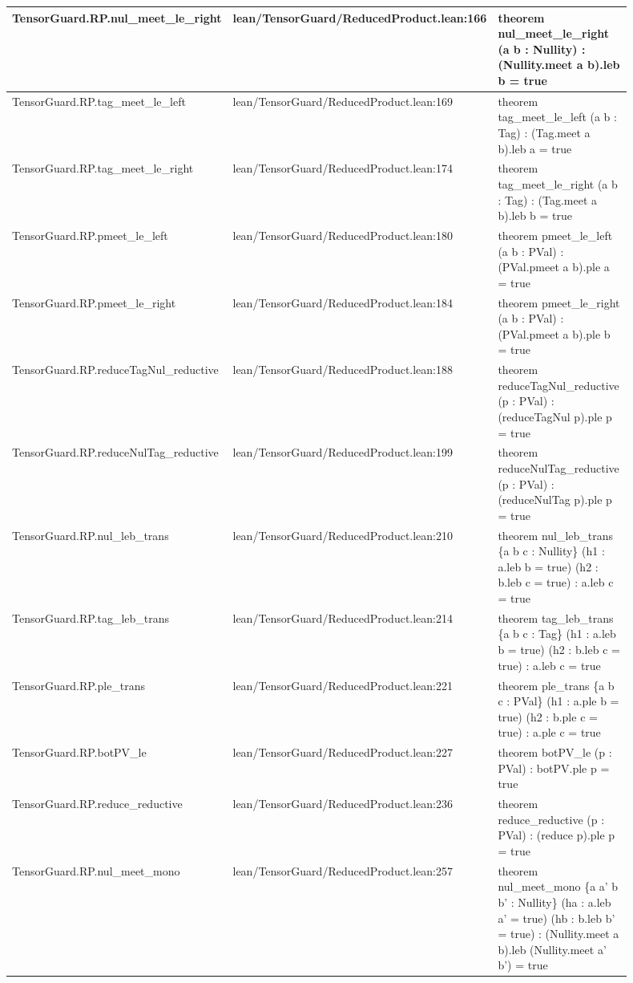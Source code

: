 \documentclass[10pt]{article}
\begin{document}
\begin{longtable}{|p{0.30\linewidth}|p{0.13\linewidth}|p{0.47\linewidth}|}
\hline
TensorGuard.RP.nul\_meet\_le\_right & lean/TensorGuard/ReducedProduct.lean:166 & theorem nul\_meet\_le\_right (a b : Nullity) : (Nullity.meet a b).leb b = true \\
\hline
TensorGuard.RP.tag\_meet\_le\_left & lean/TensorGuard/ReducedProduct.lean:169 & theorem tag\_meet\_le\_left (a b : Tag) : (Tag.meet a b).leb a = true \\
\hline
TensorGuard.RP.tag\_meet\_le\_right & lean/TensorGuard/ReducedProduct.lean:174 & theorem tag\_meet\_le\_right (a b : Tag) : (Tag.meet a b).leb b = true \\
\hline
TensorGuard.RP.pmeet\_le\_left & lean/TensorGuard/ReducedProduct.lean:180 & theorem pmeet\_le\_left (a b : PVal) : (PVal.pmeet a b).ple a = true \\
\hline
TensorGuard.RP.pmeet\_le\_right & lean/TensorGuard/ReducedProduct.lean:184 & theorem pmeet\_le\_right (a b : PVal) : (PVal.pmeet a b).ple b = true \\
\hline
TensorGuard.RP.reduceTagNul\_reductive & lean/TensorGuard/ReducedProduct.lean:188 & theorem reduceTagNul\_reductive (p : PVal) : (reduceTagNul p).ple p = true \\
\hline
TensorGuard.RP.reduceNulTag\_reductive & lean/TensorGuard/ReducedProduct.lean:199 & theorem reduceNulTag\_reductive (p : PVal) : (reduceNulTag p).ple p = true \\
\hline
TensorGuard.RP.nul\_leb\_trans & lean/TensorGuard/ReducedProduct.lean:210 & theorem nul\_leb\_trans \{a b c : Nullity\} (h1 : a.leb b = true) (h2 : b.leb c = true) : a.leb c = true \\
\hline
TensorGuard.RP.tag\_leb\_trans & lean/TensorGuard/ReducedProduct.lean:214 & theorem tag\_leb\_trans \{a b c : Tag\} (h1 : a.leb b = true) (h2 : b.leb c = true) : a.leb c = true \\
\hline
TensorGuard.RP.ple\_trans & lean/TensorGuard/ReducedProduct.lean:221 & theorem ple\_trans \{a b c : PVal\} (h1 : a.ple b = true) (h2 : b.ple c = true) : a.ple c = true \\
\hline
TensorGuard.RP.botPV\_le & lean/TensorGuard/ReducedProduct.lean:227 & theorem botPV\_le (p : PVal) : botPV.ple p = true \\
\hline
TensorGuard.RP.reduce\_reductive & lean/TensorGuard/ReducedProduct.lean:236 & theorem reduce\_reductive (p : PVal) : (reduce p).ple p = true \\
\hline
TensorGuard.RP.nul\_meet\_mono & lean/TensorGuard/ReducedProduct.lean:257 & theorem nul\_meet\_mono \{a a' b b' : Nullity\} (ha : a.leb a' = true) (hb : b.leb b' = true) : (Nullity.meet a b).leb (Nullity.meet a' b') = true \\

\end{longtable}
\end{document}
